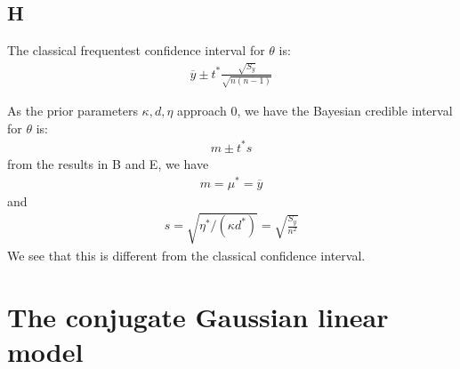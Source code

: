 \documentclass{article}
\begin{document}
\subsection*{H}
The classical frequentest confidence interval for \(\theta\) is:
\begin{align*}
\overline{y} \pm t^*\frac{\sqrt{S_y}}{\sqrt{n(n-1)}}
\end{align*}

As the prior parameters \(\kappa, d, \eta\) approach \(0\), we have the Bayesian credible interval for \(\theta\) is:
\begin{align*}
m \pm t^*s
\end{align*}
from the results in B and E, we have
\begin{align*}
m = \mu^* = \overline{y}
\end{align*}
and
\begin{align*}
s = \sqrt{\eta^*/(\kappa d^*)} = \sqrt{\frac{S_y}{n^2}}
\end{align*}
We see that this is different from the classical confidence interval.
\section{The conjugate Gaussian linear model}
\end{document}
